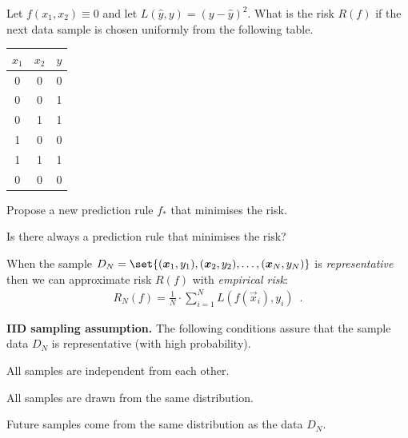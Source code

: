 \documentclass[landscape,footrule]{foils}
\begin{document}

\begin{triangles}
\item Let $f(x_1,x_2)\equiv 0$ and let $L(\hat{y}, y)= (y-\hat{y})^2$. What is the risk $R(f)$ if the next data sample is chosen uniformly from the following table.
\bigskip

\begin{center}
\begin{tabular}{|c|c|c|}
\hline
$x_1$ & $x_2$ & $y$\\ 
\hline
0 & 0 & 0\\
0 & 0 & 1\\
0 & 1 & 1\\
1 & 0 & 0\\
1 & 1 & 1\\
0 & 0 & 0\\
\hline
\end{tabular}
\bigskip

\end{center}
\item Propose a new prediction rule $f_*$ that minimises the risk. 
\item Is there always a prediction rule that minimises the risk?
\end{triangles}


When the sample $D_N=\set{(\vec{x}_1,y_1),(\vec{x}_2,y_2),\ldots, (\vec{x}_N, y_N)}$ is \emph{representative} then we can approximate risk $R(f)$ with \emph{empirical risk}:
\begin{align*}
  R_N(f)=\frac{1}{N}\cdot\sum_{i=1}^N L(f(\vec{x}_i), y_i)\enspace.
\end{align*} 
\hspace*{1cm}

\textbf{IID sampling assumption.} The following conditions assure that the sample data $D_N$ is representative (with high probability).
\begin{triangles}
\item All samples are independent from each other. 
\item All samples are drawn from the same distribution.
\item Future samples come from the same distribution as the data $D_N$.
\end{triangles}
\end{document}

